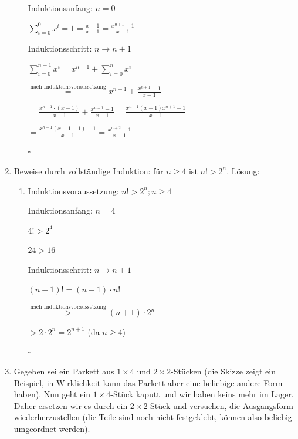 \documentclass[main.tex]{subfiles}
\begin{document}
\begin{enumerate}
\begin{enumerate}
		            Induktionsanfang: \( n = 0 \)

		            \( \sum_{i = 0}^{0} x^i = 1 = \frac{x-1}{x-1} = \frac{x^{0 + 1} - 1}{ x - 1 } \)
		            \vspace{10pt}

		            Induktionsschritt: \( n \rightarrow n + 1 \)

		            \( \sum_{i = 0}^{n + 1} x^i = x^{n + 1} + \sum_{i = 0}^{n} x^i \)

		            \( \stackrel{\text{nach Induktionsvoraussetzung}}{=}
		            x^{n+1} +  \frac{x^{n + 1} - 1}{ x - 1 } \)

		            \( =  \frac{x^{n+1} \cdot (x - 1)}{x - 1} +  \frac{x^{n + 1} - 1}{ x - 1 }
		            = \frac{x^{n+1}(x - 1) x^{n + 1} - 1}{ x - 1 }\)

		            \( = \frac{x^{n + 1}(x - 1 + 1) - 1 }{ x - 1 }
		            =  \frac{x^{n + 2} - 1 }{ x - 1 } \)

		            \( \square \)
	      \end{enumerate}
	\item Beweise durch vollständige Induktion: für \(  n \geq 4 \) ist \( n! > 2^n \).
	      Lösung:
	      \begin{enumerate}
		      \item Induktionsvoraussetzung:
		            \( n! > 2^n ; n \geq 4 \)
		            \vspace{10pt}

		            Induktionsanfang: \( n = 4 \)

		            \( 4! > 2^4 \)

		            \( 24 > 16 \)
		            \vspace{10pt}

		            Induktionsschritt: \( n \rightarrow n + 1 \)

		            \( (n + 1)! = (n + 1) \cdot n! \)

		            \( \stackrel{\text{nach Induktionsvoraussetzung}}{>}
		            (n + 1) \cdot 2^n \)

		            \( > 2 \cdot 2^n = 2^{n + 1} \) (da \( n \geq 4 \))

		            \( \square \)
	      \end{enumerate}
	\item Gegeben sei ein Parkett aus \( 1 \times 4 \) und \( 2 \times 2 \)-Stücken (die Skizze zeigt ein Beispiel,
	      in Wirklichkeit kann das Parkett aber eine beliebige andere Form haben).
	      Nun geht ein \( 1 \times 4 \)-Stück kaputt und wir haben keins mehr im Lager.
	      Daher ersetzen wir es durch ein \( 2 \times 2 \) Stück und versuchen, die Ausgangsform wiederherzustellen
		(die Teile sind noch nicht festgeklebt, können also beliebig umgeordnet werden).


\end{enumerate}
\end{document}
